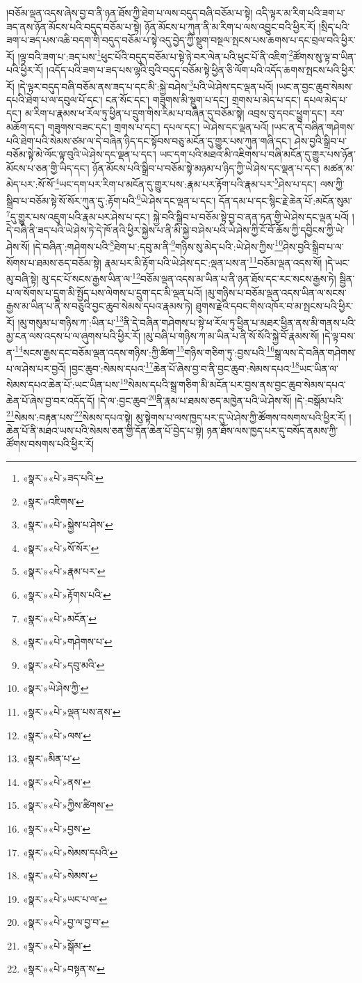 །བཅོམ་ལྡན་འདས་ཞེས་བྱ་བ་ནི་ཉན་ཐོས་ཀྱི་ཐེག་པ་ལས་བདུད་བཞི་བཅོམ་པ་སྟེ། འདི་ལྟར་མ་རིག་པའི་ཟག་པ་ཟད་ནས་ཉོན་མོངས་པའི་བདུད་བཅོམ་པ་སྟེ། ཉོན་མོངས་པ་ཀུན་ནི་མ་རིག་པ་ལས་འབྱུང་བའི་ཕྱིར་རོ། །སྲིད་པའི་ཟག་པ་ཟད་པས་འཆི་བདག་གི་བདུད་བཅོམ་པ་སྟེ་འདུ་བྱེད་ཀྱི་སྡུག་བསྔལ་སྤངས་པས་ཆགས་པ་དང་བྲལ་བའི་ཕྱིར་རོ། །ལྟ་བའི་ཟག་པ་:ཟད་པས་\footnote{«སྣར་»«པེ་»ཟད་པའི་}ཕུང་པོའི་བདུད་བཅོམ་པ་སྟེ་ཉེ་བར་ལེན་པའི་ཕུང་པོ་ནི་འཇིག་\footnote{«སྣར་»འཇིགས་}ཚོགས་སུ་ལྟ་བ་ཡིན་པའི་ཕྱིར་རོ། །འདོད་པའི་ཟག་པ་ཟད་པས་ལྷའི་བུའི་བདུད་བཅོམ་སྟེ་ཕྱིན་ཅི་ལོག་པའི་འདོད་ཆགས་སྤངས་པའི་ཕྱིར་རོ། །དེ་ལྟར་བདུད་བཞི་བཅོམ་ནས་ཟད་པ་དང་མི་:སྐྱེ་བཤེས་\footnote{«སྣར་»«པེ་»སྐྱེས་པ་ཤེས་}པའི་ཡེ་ཤེས་དང་ལྡན་པའོ། །ཡང་ན་བྱང་ཆུབ་སེམས་དཔའི་ཐེག་པ་ལ་དབུལ་པོ་དང་། ངན་སོང་དང་། གཟུགས་མི་སྡུག་པ་དང་། གྲགས་པ་མེད་པ་དང་། དཔལ་མེད་པ་དང་། མ་རིག་པ་རྣམས་ཕ་རོལ་ཏུ་ཕྱིན་པ་དྲུག་གིས་རིམ་པ་བཞིན་དུ་བཅོམ་སྟེ། འབྲས་བུ་དབང་ཕྱུག་དང་། རབ་མཆོག་དང་། གཟུགས་བཟང་དང་། གྲགས་པ་དང་། དཔལ་དང་། ཡེ་ཤེས་དང་ལྡན་པའོ། །ཡང་ན་དེ་བཞིན་གཤེགས་པའི་ཐེག་པའི་སེམས་ཙམ་ལ་དེ་བཞིན་ཉིད་དང་སྟོབས་བཅུ་མངོན་དུ་གྱུར་པས་ཀུན་གཞི་དང་། ཤེས་བྱའི་སྒྲིབ་པ་བཅོམ་སྟེ་མེ་ལོང་ལྟ་བུའི་ཡེ་ཤེས་དང་ལྡན་པ་དང་། ཡང་དག་པའི་མཐའ་མི་འཇིགས་པ་བཞི་མངོན་དུ་གྱུར་པས་ཉོན་མོངས་པ་ཅན་གྱི་ཡིད་དང་། ཉོན་མོངས་པའི་སྒྲིབ་པ་བཅོམ་སྟེ་མཉམ་པ་ཉིད་ཀྱི་ཡེ་ཤེས་དང་ལྡན་པ་དང་། མཚན་མ་མེད་པར་:སོ་སོ་\footnote{«སྣར་»«པེ་»སོ་སོར་}ཡང་དག་པར་རིག་པ་མངོན་དུ་གྱུར་པས་:རྣམ་པར་རྟོག་པའི་རྣམ་པར་\footnote{«སྣར་»«པེ་»རྣམ་པར་}ཤེས་པ་དང་། ལས་ཀྱི་སྒྲིབ་པ་བཅོམ་སྟེ་སོ་སོར་ཀུན་དུ་:རྟོག་པའི་\footnote{«སྣར་»«པེ་»རྟོགས་པའི་}ཡེ་ཤེས་དང་ལྡན་པ་དང་། དོན་དམ་པ་དང་སྙིང་རྗེ་ཆེན་པོ་:མངོན་སུམ་\footnote{«སྣར་»«པེ་»མངོན་}དུ་གྱུར་པས་འཇུག་པའི་རྣམ་པར་ཤེས་པ་དང་། སྐྱེ་བའི་སྒྲིབ་པ་བཅོམ་སྟེ་བྱ་བ་ནན་ཏན་གྱི་ཡེ་ཤེས་དང་ལྡན་པའོ། །དེ་བཞི་ནི་ཟད་པའི་ཡེ་ཤེས་ཏེ་དེ་ཁོ་ནའི་ཕྱིར་སྐྱེས་པ་ནི་མི་སྐྱེ་བ་ཤེས་པའི་ཡེ་ཤེས་ཀྱི་ངོ་བོ་ཆོས་ཀྱི་དབྱིངས་ཀྱི་ཡེ་ཤེས་སོ། །དེ་བཞིན་:གཤེགས་པའི་\footnote{«སྣར་»«པེ་»གཤེགས་པ་}ཐེག་པ་:དབུ་མ་ནི་\footnote{«སྣར་»«པེ་»དབུ་མའི་}གཉིས་སུ་མེད་པའི་:ཡེ་ཤེས་ཀྱིས་\footnote{«སྣར་»ཡེ་ཤེས་ཀྱི་}ཤེས་བྱའི་སྒྲིབ་པ་ལ་སོགས་པ་ཐམས་ཅད་བཅོམ་སྟེ། རྣམ་པར་མི་རྟོག་པའི་ཡེ་ཤེས་དང་:ལྡན་པས་ན་\footnote{«སྣར་»«པེ་»ལྡན་པས་ནས་}བཅོམ་ལྡན་འདས་སོ། །དེ་ཡང་མུ་བཞི་སྟེ། མུ་དང་པོ་སངས་རྒྱས་ཡིན་ལ་\footnote{«སྣར་»«པེ་»ལས་}བཅོམ་ལྡན་འདས་མ་ཡིན་པ་ནི་ཉན་ཐོས་དང་རང་སངས་རྒྱས་ཏེ། སྦྱིན་པ་ལ་སོགས་པ་དྲུག་མི་སྤྱོད་པས་ལེགས་པ་དྲུག་དང་མི་ལྡན་པའོ། །མུ་གཉིས་པ་བཅོམ་ལྡན་འདས་ཡིན་ལ་སངས་རྒྱས་མ་ཡིན་པ་ནི་ས་བཅུའི་བྱང་ཆུབ་སེམས་དཔའ་རྣམས་ཏེ། ཐུགས་རྗེའི་དབང་གིས་འཁོར་བ་མ་སྤངས་པའི་ཕྱིར་རོ། །མུ་གསུམ་པ་གཉིས་ཀ་:ཡིན་པ་\footnote{«སྣར་»མིན་པ་}ནི་དེ་བཞིན་གཤེགས་པ་སྟེ་ཕ་རོལ་ཏུ་ཕྱིན་པ་མཐར་ཕྱིན་ནས་མི་གནས་པའི་མྱ་ངན་ལས་འདས་པ་ལ་ཞུགས་པའི་ཕྱིར་རོ། །མུ་བཞི་པ་གཉིས་ཀ་མ་ཡིན་པ་ནི་སོ་སོའི་སྐྱེ་བོ་རྣམས་སོ། །དེ་ལྟ་བས་ན་\footnote{«སྣར་»«པེ་»ནས་}སངས་རྒྱས་དང་བཅོམ་ལྡན་འདས་གཉིས་:ཀྱི་ཚིག་\footnote{«སྣར་»«པེ་»ཀྱིས་ཚིགས་}གཉིས་གཅིག་ཏུ་:བྱས་པའི་\footnote{«སྣར་»«པེ་»བྱས་}སྒྲ་ལས་དེ་བཞིན་གཤེགས་པ་ལ་ཤེས་པར་བྱའོ། །བྱང་ཆུབ་:སེམས་དཔའ་\footnote{«སྣར་»«པེ་»སེམས་དཔའི་}ཆེན་པོ་ཞེས་བྱ་བ་ནི་བྱང་ཆུབ་:སེམས་དཔའ་\footnote{«སྣར་»«པེ་»སེམས་}ཡང་ཡིན་ལ་སེམས་དཔའ་ཆེན་པོ་:ཡང་ཡིན་པས་\footnote{«སྣར་»«པེ་»ཡང་པ་ལ་}སེམས་དཔའི་སྒྲ་གཅིག་མི་མངོན་པར་བྱས་ནས་བྱང་ཆུབ་སེམས་དཔའ་ཆེན་པོ་ཞེས་བྱ་བར་འདོད་དོ། །དེ་ལ་:བྱང་ཆུབ་\footnote{«སྣར་»«པེ་»བྱ་ལ་བྱ་བ་}ནི་རྣམ་པ་ཐམས་ཅད་མཁྱེན་པའི་ཡེ་ཤེས་སོ། །དེ་:བསྒོམ་པའི་\footnote{«སྣར་»«པེ་»སྒོམ་}སེམས་:བརྟན་པས་\footnote{«སྣར་»«པེ་»བསྟན་ས་}སེམས་དཔའ་སྟེ། མུ་སྟེགས་པ་ལས་ཁྱད་པར་དུ་ཡེ་ཤེས་ཀྱི་ཚོགས་བསགས་པའི་ཕྱིར་རོ། །ཆེན་པོ་ནི་མཐའ་ཡས་པའི་སེམས་ཅན་གྱི་དོན་ཆེན་པོ་བྱེད་པ་སྟེ། ཉན་ཐོས་ལས་ཁྱད་པར་དུ་བསོད་ནམས་ཀྱི་ཚོགས་བསགས་པའི་ཕྱིར་རོ། 